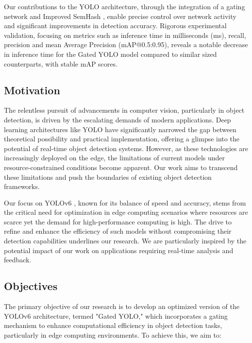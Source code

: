 Our contributions to the YOLO architecture, through the integration of a gating network and Improved SemHash \cite{kaiser2018discrete}, enable precise control over network activity and significant improvements in detection accuracy. Rigorous experimental validation, focusing on metrics such as inference time in milliseconds (ms), recall, precision and mean Average Precision (mAP@0.5:0.95), reveals a notable decrease in inference time for the Gated YOLO model compared to similar sized counterparts, with stable mAP scores.

\subsection{Motivation}

The relentless pursuit of advancements in computer vision, particularly in object detection, is driven by the escalating demands of modern applications. Deep learning architectures like YOLO have significantly narrowed the gap between theoretical possibility and practical implementation, offering a glimpse into the potential of real-time object detection systems. However, as these technologies are increasingly deployed on the edge, the limitations of current models under resource-constrained conditions become apparent. Our work aims to transcend these limitations and push the boundaries of existing object detection frameworks.

Our focus on YOLOv6 \cite{li2022yolov6,li2023yolov6}, known for its balance of speed and accuracy, stems from the critical need for optimization in edge computing scenarios where resources are scarce yet the demand for high-performance computing is high. The drive to refine and enhance the efficiency of such models without compromising their detection capabilities underlines our research. We are particularly inspired by the potential impact of our work on applications requiring real-time analysis and feedback.

\subsection{Objectives}

The primary objective of our research is to develop an optimized version of the YOLOv6 \cite{li2022yolov6,li2023yolov6} architecture, termed "Gated YOLO," which incorporates a gating mechanism to enhance computational efficiency in object detection tasks, particularly in edge computing environments. To achieve this, we aim to:

